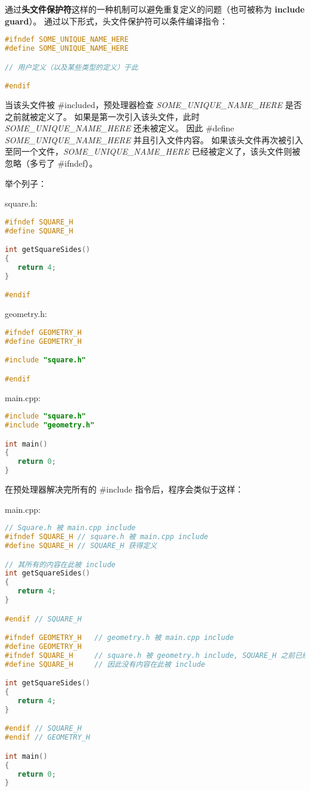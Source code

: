 \documentclass[../../LearnCpp.tex]{subfiles}
\begin{document}

通过\textbf{头文件保护符}这样的一种机制可以避免重复定义的问题（也可被称为 \textbf{include guard}）。
通过以下形式，头文件保护符可以条件编译指令：

\begin{lstlisting}[language=C++]
#ifndef SOME_UNIQUE_NAME_HERE
#define SOME_UNIQUE_NAME_HERE

// 用户定义（以及某些类型的定义）于此

#endif
\end{lstlisting}

当该头文件被 \#included，预处理器检查 \textit{SOME\_UNIQUE\_NAME\_HERE} 是否之前就被定义了。
如果是第一次引入该头文件，此时 \textit{SOME\_UNIQUE\_NAME\_HERE} 还未被定义。
因此 \#define \textit{SOME\_UNIQUE\_NAME\_HERE} 并且引入文件内容。
如果该头文件再次被引入至同一个文件，\textit{SOME\_UNIQUE\_NAME\_HERE} 已经被定义了，该头文件则被忽略（多亏了 \#ifndef）。

举个列子：

square.h:

\begin{lstlisting}[language=C++]
#ifndef SQUARE_H
#define SQUARE_H

int getSquareSides()
{
   return 4;
}

#endif
\end{lstlisting}

geometry.h:

\begin{lstlisting}[language=C++]
#ifndef GEOMETRY_H
#define GEOMETRY_H

#include "square.h"

#endif
\end{lstlisting}

main.cpp:

\begin{lstlisting}[language=C++]
#include "square.h"
#include "geometry.h"

int main()
{
   return 0;
}
\end{lstlisting}

在预处理器解决完所有的 \#include 指令后，程序会类似于这样：

main.cpp:

\begin{lstlisting}[language=C++]
// Square.h 被 main.cpp include
#ifndef SQUARE_H // square.h 被 main.cpp include
#define SQUARE_H // SQUARE_H 获得定义

// 其所有的内容在此被 include
int getSquareSides()
{
   return 4;
}

#endif // SQUARE_H

#ifndef GEOMETRY_H   // geometry.h 被 main.cpp include
#define GEOMETRY_H
#ifndef SQUARE_H     // square.h 被 geometry.h include, SQUARE_H 之前已经被定义过了
#define SQUARE_H     // 因此没有内容在此被 include

int getSquareSides()
{
   return 4;
}

#endif // SQUARE_H
#endif // GEOMETRY_H

int main()
{
   return 0;
}
\end{lstlisting}
\end{document}
